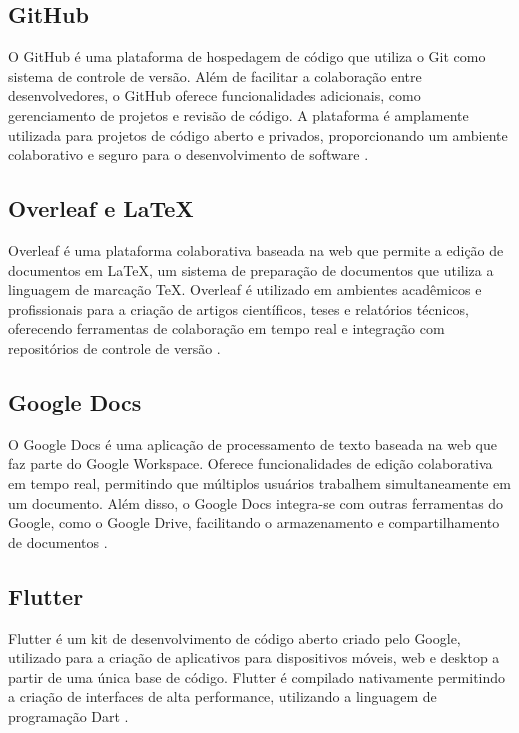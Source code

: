 \subsection{GitHub}

O GitHub é uma plataforma de hospedagem de código que utiliza o Git como sistema de controle de versão. Além de facilitar a colaboração entre desenvolvedores, o GitHub oferece funcionalidades adicionais, como gerenciamento de projetos e revisão de código. A plataforma é amplamente utilizada para projetos de código aberto e privados, proporcionando um ambiente colaborativo e seguro para o desenvolvimento de software \cite{github2025}.

\subsection{Overleaf e LaTeX}

Overleaf é uma plataforma colaborativa baseada na web que permite a edição de documentos em LaTeX, um sistema de preparação de documentos que utiliza a linguagem de marcação TeX. Overleaf é utilizado em ambientes acadêmicos e profissionais para a criação de artigos científicos, teses e relatórios técnicos, oferecendo ferramentas de colaboração em tempo real e integração com repositórios de controle de versão \cite{overleaf2025}.

\subsection{Google Docs}

O Google Docs é uma aplicação de processamento de texto baseada na web que faz parte do Google Workspace. Oferece funcionalidades de edição colaborativa em tempo real, permitindo que múltiplos usuários trabalhem simultaneamente em um documento. Além disso, o Google Docs integra-se com outras ferramentas do Google, como o Google Drive, facilitando o armazenamento e compartilhamento de documentos \cite{docs2025}.

\subsection{Flutter}

Flutter é um kit de desenvolvimento de código aberto criado pelo Google, utilizado para a criação de aplicativos para dispositivos móveis, web e desktop a partir de uma única base de código. Flutter é compilado nativamente permitindo a criação de interfaces de alta performance, utilizando a linguagem de programação Dart \cite{flutter2025}.

